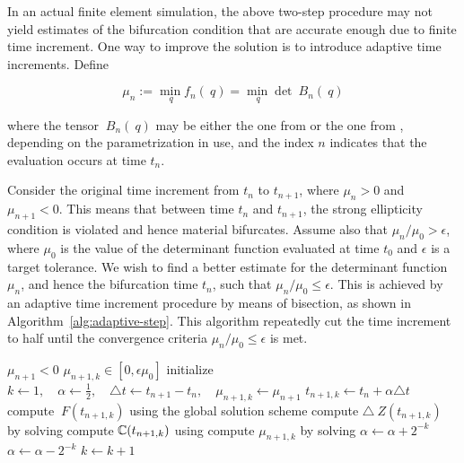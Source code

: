 \documentclass[12pt]{article}
\numberwithin{equation}{section}
\begin{document}
In an actual finite element simulation, the above two-step procedure
may not yield estimates of the bifurcation condition that are accurate
enough due to finite time increment. One way to improve the solution
is to introduce adaptive time increments. Define

\begin{equation} \label{eq:general-minimization-problem}
  \mu_n := \min_{~q} f_n(~q) = \min_{~q} \det ~B_n(~q)
\end{equation}

where the tensor $~B_n(~q)$ may be either the one from
 or the one from
, depending on the parametrization
in use, and the index $n$ indicates that the evaluation occurs at time
$t_n$.

Consider the original time increment from $t_n$ to $t_{n+1}$, where
$\mu_n > 0$ and $\mu_{n+1} < 0$. This means that between time $t_n$
and $t_{n+1}$, the strong ellipticity condition is violated and hence
material bifurcates. Assume also that $\mu_n / \mu_0 > \epsilon$,
where $\mu_0$ is the value of the determinant function evaluated at
time $t_0$ and $\epsilon$ is a target tolerance. We wish to find a
better estimate for the determinant function $\mu_n$, and hence the
bifurcation time $t_n$, such that $\mu_n / \mu_0 \le \epsilon$. This
is achieved by an adaptive time increment procedure by means of
bisection, as shown in Algorithm~\ref{alg:adaptive-step}. This
algorithm repeatedly cut the time increment to half until the
convergence criteria $\mu_n / \mu_0 \le \epsilon$ is met.

\begin{algorithm}
  \caption{$\text{AdaptiveStep}(\mu_0, \mu_{n+1}, t_{n+1}, \epsilon)$}
  \begin{algorithmic}
    \REQUIRE $\mu_{n+1} < 0$
    \ENSURE $\mu_{n+1,k} \in [0, \epsilon \mu_0]$
    \STATE initialize
    $k \leftarrow 1,
    \quad
    \alpha \leftarrow \frac{1}{2},
    \quad
    \triangle t \leftarrow t_{n+1} - t_n,
    \quad
    \mu_{n+1,k} \leftarrow \mu_{n+1}$
    \STATE $t_{n+1,k} \leftarrow t_n + \alpha \triangle t$
    \STATE compute $~F(t_{n+1,k})$ using the global solution scheme
    \STATE compute $\triangle ~Z(t_{n+1,k})$
    by solving 
    \STATE compute $\mathbb{C}(t_{n+1,k})$
    using 
    \STATE compute $\mu_{n+1,k}$
    by solving 
    \STATE $\alpha \leftarrow \alpha + 2^{-k}$
    \ELSE
    \STATE $\alpha \leftarrow \alpha - 2^{-k}$
    \ENDIF
    \STATE $k \leftarrow k+1$
    \ENDWHILE
  \end{algorithmic}
  \label{alg:adaptive-step}
\end{algorithm}
\end{document}
